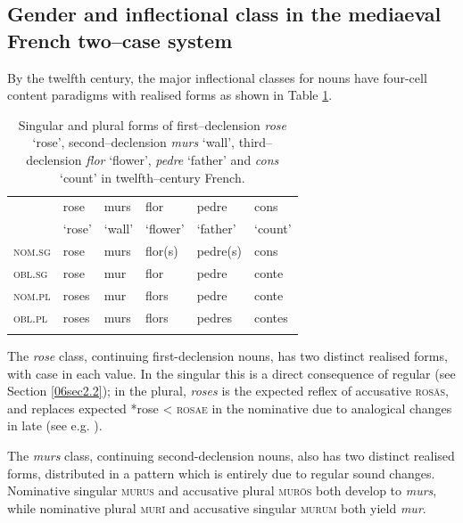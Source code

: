 \documentclass[output=paper,colorlinks,citecolor=brown]{langscibook}
\begin{document}
\subsection{Gender and inflectional class in the mediaeval French two--case	system} \label{06sec4.3}

By the twelfth century, the major inflectional classes for nouns have four-cell content paradigms with realised forms as shown in Table \ref{06tab4}.

\begin{table}[ht]
	\centering
	\begin{tabularx}{0.8\textwidth}{lXXXXX}
		\lsptoprule
			& rose & murs & flor & pedre & cons \\
			& ‘rose’ & ‘wall’ & ‘flower’ & ‘father’ & ‘count’ \\
		\midrule
			\textsc{nom.sg} & rose & murs & flor(s) & pedre(s) & cons \\
			\textsc{obl.sg} & rose & mur & flor & pedre & conte \\
			\textsc{nom.pl} & roses & mur & flors & pedre & conte \\
			\textsc{obl.pl} & roses & murs & flors & pedres & contes \\
		\lspbottomrule
	\end{tabularx}
	\caption{Singular and plural forms of first–declension \emph{rose} ‘rose’, second–declension \emph{murs} ‘wall’, third–declension \emph{flor} ‘flower’, \emph{pedre} ‘father’ and \emph{cons} ‘count’ in twelfth–century French.}
	\label{06tab4}
\end{table}

The \emph{rose} class, continuing  first-declension nouns, has two distinct realised forms, with case  in each  value. In the singular this is a direct consequence of regular  (see Section \ref{06sec2.2}); in the plural, \emph{roses} is the expected reflex of accusative \textsc{rosās}, and replaces expected *rose \textless{} \textsc{rosae} in the nominative due to analogical changes in late  (see e.g. \citealt{schosler2013}).

The \emph{murs} class, continuing  second-declension nouns, also has two distinct realised forms, distributed in a pattern which is entirely due to regular sound changes. Nominative singular \textsc{murus} and accusative plural \textsc{murōs} both develop to \emph{murs}, while nominative plural \textsc{murī} and accusative singular \textsc{murum} both yield \emph{mur}.
\end{document}
